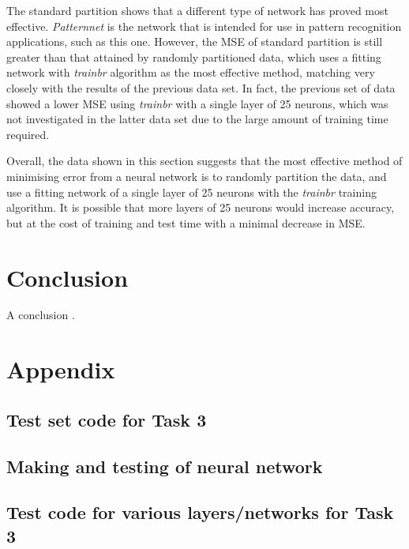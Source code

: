 \documentclass[a4paper, 10pt, conference]{ieeeconf}
\begin{document}
The standard partition shows that a different type of network has proved most effective. \textit{Patternnet} is the network that is intended for use in pattern recognition applications, such as this one. However, the MSE of standard partition is still greater than that attained by randomly partitioned data, which uses a fitting network with \textit{trainbr} algorithm as the most effective method, matching very closely with the results of the previous data set. In fact, the previous set of data showed a lower MSE using \textit{trainbr} with a single layer of 25 neurons, which was not investigated in the latter data set due to the large amount of training time required. 

Overall, the data shown in this section suggests that the most effective method of minimising error from a neural network is to randomly partition the data, and use a fitting network of a single layer of 25 neurons with the \textit{trainbr} training algorithm. It is possible that more layers of 25 neurons would increase accuracy, but at the cost of training and test time with a minimal decrease in MSE.


\section{Conclusion}

A conclusion \cite{pca}. 




\onecolumn
\section{Appendix} \label{sec:appendix}

\subsection*{Test set code for Task 3}

\newpage

\subsection*{Making and testing of neural network}

\newpage

\subsection*{Test code for various layers/networks for Task 3}

\newpage
\end{document}
